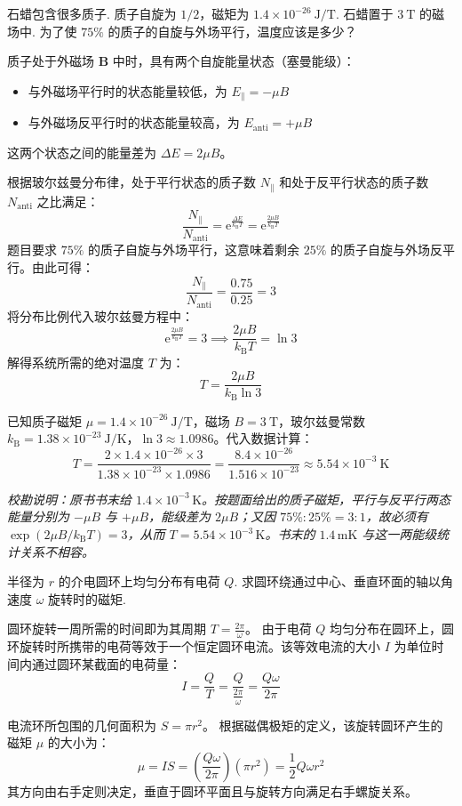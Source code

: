 \begin{exercise}\label{ex:19.3}
石蜡包含很多质子. 质子自旋为 $1/2$，磁矩为 $1.4 \times 10^{-26} \ \mathrm{J/T}$. 石蜡置于 $3 \ \mathrm{T}$ 的磁场中. 为了使 $75\%$ 的质子的自旋与外场平行，温度应该是多少？
\end{exercise}
\begin{solution}
质子处于外磁场 $\boldsymbol{B}$ 中时，具有两个自旋能量状态（塞曼能级）：
\begin{itemize}
    \item 与外磁场平行时的状态能量较低，为 $E_{\parallel} = -\mu B$
    \item 与外磁场反平行时的状态能量较高，为 $E_{\text{anti}} = +\mu B$
\end{itemize}
这两个状态之间的能量差为 $\Delta E = 2\mu B$。

根据玻尔兹曼分布律，处于平行状态的质子数 $N_{\parallel}$ 和处于反平行状态的质子数 $N_{\text{anti}}$ 之比满足：
$$ \frac{N_{\parallel}}{N_{\text{anti}}} = \mathrm{e}^{\frac{\Delta E}{k_{\mathrm{B}} T}} = \mathrm{e}^{\frac{2\mu B}{k_{\mathrm{B}} T}} $$
题目要求 $75\%$ 的质子自旋与外场平行，这意味着剩余 $25\%$ 的质子自旋与外场反平行。由此可得：
$$ \frac{N_{\parallel}}{N_{\text{anti}}} = \frac{0.75}{0.25} = 3 $$
将分布比例代入玻尔兹曼方程中：
$$ \mathrm{e}^{\frac{2\mu B}{k_{\mathrm{B}} T}} = 3 \implies \frac{2\mu B}{k_{\mathrm{B}} T} = \ln 3 $$
解得系统所需的绝对温度 $T$ 为：
$$ T = \frac{2\mu B}{k_{\mathrm{B}} \ln 3} $$

已知质子磁矩 $\mu = 1.4 \times 10^{-26} \ \mathrm{J/T}$，磁场 $B = 3 \ \mathrm{T}$，玻尔兹曼常数 $k_{\mathrm{B}} = 1.38 \times 10^{-23} \ \mathrm{J/K}$，$\ln 3 \approx 1.0986$。代入数据计算：
$$ T = \frac{2 \times 1.4 \times 10^{-26} \times 3}{1.38 \times 10^{-23} \times 1.0986} = \frac{8.4 \times 10^{-26}}{1.516 \times 10^{-23}} \approx 5.54 \times 10^{-3} \ \mathrm{K} $$

\textit{校勘说明：原书书末给 $1.4\times10^{-3}\,\mathrm K$。按题面给出的质子磁矩，平行与反平行两态能量分别为 $-\mu B$ 与 $+\mu B$，能级差为 $2\mu B$；又因 $75\%:25\%=3:1$，故必须有 $\exp(2\mu B/k_{\mathrm{B}}T)=3$，从而 $T=5.54\times10^{-3}\,\mathrm K$。书末的 $1.4\,\mathrm{mK}$ 与这一两能级统计关系不相容。}
\end{solution}

\begin{exercise}\label{ex:19.4}
半径为 $r$ 的介电圆环上均匀分布有电荷 $Q$. 求圆环绕通过中心、垂直环面的轴以角速度 $\omega$ 旋转时的磁矩.
\end{exercise}
\begin{solution}
圆环旋转一周所需的时间即为其周期 $T = \frac{2\pi}{\omega}$。
由于电荷 $Q$ 均匀分布在圆环上，圆环旋转时所携带的电荷等效于一个恒定圆环电流。该等效电流的大小 $I$ 为单位时间内通过圆环某截面的电荷量：
$$ I = \frac{Q}{T} = \frac{Q}{\frac{2\pi}{\omega}} = \frac{Q\omega}{2\pi} $$

电流环所包围的几何面积为 $S = \pi r^2$。
根据磁偶极矩的定义，该旋转圆环产生的磁矩 $\mu$ 的大小为：
$$ \mu = I S = \left( \frac{Q\omega}{2\pi} \right) \left( \pi r^2 \right) = \frac{1}{2} Q \omega r^2 $$
其方向由右手定则决定，垂直于圆环平面且与旋转方向满足右手螺旋关系。
\end{solution}

